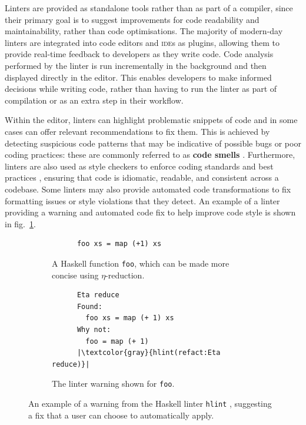 Linters are provided as standalone tools rather than as part of a compiler, since their primary goal is to suggest improvements for code readability and maintainability, rather than code optimisations.
The majority of modern-day linters are integrated into code editors and \textsc{ide}s as plugins, allowing them to provide real-time feedback to developers as they write code.
Code analysis performed by the linter is run incrementally in the background and then displayed directly in the editor.
This enables developers to make informed decisions while writing code, rather than having to run the linter as part of compilation or as an extra step in their workflow.

Within the editor, linters can highlight problematic snippets of code and in some cases can offer relevant recommendations to fix them.
This is achieved by detecting suspicious code patterns that may be indicative of possible bugs or poor coding practices: these are commonly referred to as \textbf{code smells} \cite{fowler_refactoring_2018}.
Furthermore, linters are also used as style checkers to enforce coding standards and best practices , ensuring that code is idiomatic, readable, and consistent across a codebase.
Some linters may also provide automated code transformations to fix formatting issues or style violations that they detect.
An example of a linter providing a warning and automated code fix to help improve code style is shown in fig.~\ref{fig:hlint-example}.

\begin{figure}[htbp]
  \vspace{3ex} %
  \centering
  \begin{subfigure}{0.45\textwidth}
    \centering
    \begin{verbatim}
      foo xs = map (+1) xs
    \end{verbatim}
    \caption{A Haskell function \texttt{foo}, which can be made more concise using $\eta$-reduction.}
  \end{subfigure}
  \hfill
  \begin{subfigure}{0.45\textwidth}
    \centering
    \begin{verbatim}
      Eta reduce
      Found:
        foo xs = map (+ 1) xs
      Why not:
        foo = map (+ 1)
      |\textcolor{gray}{hlint(refact:Eta reduce)}|
    \end{verbatim}
    \caption{The linter warning shown for \texttt{foo}.}
  \end{subfigure}
  \caption{An example of a warning from the Haskell linter \texttt{hlint} \cite{mitchell_hlint_2024}, suggesting a fix that a user can choose to automatically apply.}
  \label{fig:hlint-example}
\end{figure}

